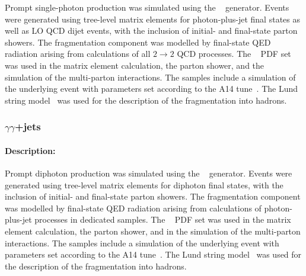Prompt single-photon production was simulated using the \PYTHIA[8.186]~\cite{Sjostrand:2007gs} generator. 
Events were generated using tree-level matrix elements for photon-plus-jet final
states as well as LO QCD dijet events, with the inclusion of initial-
and final-state parton showers. The fragmentation component was
modelled by final-state QED radiation arising from calculations of all
$2\rightarrow 2$ QCD processes. The \NNPDF[2.3lo]~\cite{Ball:2012cx} PDF
set was used in the matrix element calculation, the parton shower, and
the simulation of the multi-parton interactions. The samples
include a simulation of the underlying event with parameters set
according to the A14 tune~\cite{ATL-PHYS-PUB-2014-021}. The Lund
string model~\cite{Andersson:1983ia,Sjostrand:1984ic} was used for the
description of the fragmentation into hadrons.




\subsubsection[yy+jets]{ $\gamma\gamma$+jets}

\paragraph{Description:}

Prompt diphoton production was simulated using the 
\PYTHIA[8.186]~\cite{Sjostrand:2007gs} generator. Events were 
generated using tree-level matrix elements for diphoton final states,
with the inclusion of initial- and final-state parton showers.  The
fragmentation component was modelled by final-state QED radiation
arising from calculations of photon-plus-jet processes in dedicated
samples. The \NNPDF[2.3lo]~\cite{Ball:2012cx} PDF set was used in the
matrix element calculation, the parton shower, and in the simulation of the
multi-parton interactions. The samples include a simulation of the
underlying event with parameters set according to the A14
tune~\cite{ATL-PHYS-PUB-2014-021}. The Lund string
model~\cite{Andersson:1983ia,Sjostrand:1984ic} was used for the
description of the fragmentation into hadrons.

